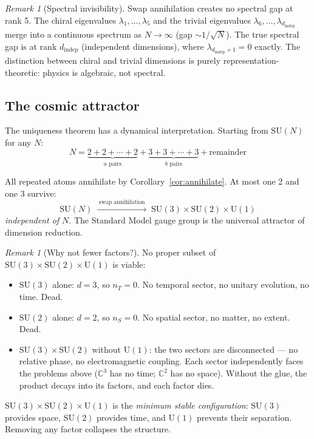 \documentclass[12pt]{article}
\theoremstyle{remark}
\newtheorem{remark}[theorem]{Remark}
\theoremstyle{definition}
\newcommand{\CC}{\mathbb{C}}
\begin{document}
\begin{remark}[Spectral invisibility]
Swap annihilation creates no spectral gap at rank 5. The chiral eigenvalues $\lambda_1, \ldots, \lambda_5$ and the trivial eigenvalues $\lambda_6, \ldots, \lambda_{d_\text{indep}}$ merge into a continuous spectrum as $N \to \infty$ (gap $\sim 1/\sqrt{N}$). The true spectral gap is at rank $d_\text{indep}$ (independent dimensions), where $\lambda_{d_\text{indep}+1} = 0$ exactly. The distinction between chiral and trivial dimensions is purely representation-theoretic: physics is algebraic, not spectral.
\end{remark}

\subsection{The cosmic attractor}

The uniqueness theorem has a dynamical interpretation. Starting from $\text{SU}(N)$ for any $N$:
\begin{equation}
N = \underbrace{2 + 2 + \cdots + 2}_{a\text{ pairs}} + \underbrace{3 + 3 + \cdots + 3}_{b\text{ pairs}} + \text{remainder}
\end{equation}

All repeated atoms annihilate by Corollary~\ref{cor:annihilate}. At most one 2 and one 3 survive:
\begin{equation}
\text{SU}(N) \;\xrightarrow{\;\text{swap annihilation}\;}\; \text{SU}(3) \times \text{SU}(2) \times \text{U}(1)
\end{equation}
\emph{independent of $N$}. The Standard Model gauge group is the universal attractor of dimension reduction.

\begin{remark}[Why not fewer factors?]
No proper subset of $\text{SU}(3) \times \text{SU}(2) \times \text{U}(1)$ is viable:
\begin{itemize}
\item $\text{SU}(3)$ alone: $d = 3$, so $n_T = 0$. No temporal sector, no unitary evolution, no time. Dead.
\item $\text{SU}(2)$ alone: $d = 2$, so $n_S = 0$. No spatial sector, no matter, no extent. Dead.
\item $\text{SU}(3) \times \text{SU}(2)$ without $\text{U}(1)$: the two sectors are disconnected --- no relative phase, no electromagnetic coupling. Each sector independently faces the problems above ($\CC^3$ has no time; $\CC^2$ has no space). Without the glue, the product decays into its factors, and each factor dies.
\end{itemize}
$\text{SU}(3) \times \text{SU}(2) \times \text{U}(1)$ is the \emph{minimum stable configuration}: $\text{SU}(3)$ provides space, $\text{SU}(2)$ provides time, and $\text{U}(1)$ prevents their separation. Removing any factor collapses the structure.
\end{remark}
\end{document}

